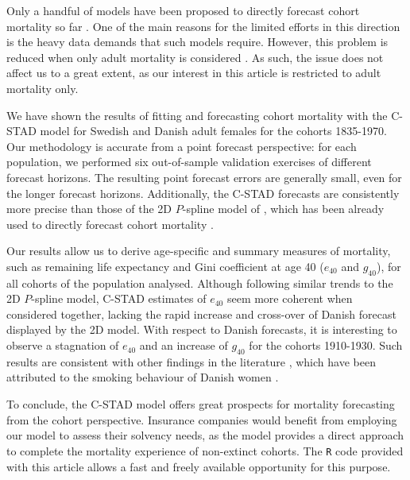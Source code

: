 \documentclass[11pt, a4paper]{article}
\begin{document}
Only a handful of models have been proposed to directly forecast cohort mortality so far \citep{chiou2009modeling,zanotto2017reconstruction,rizzi2019forecasting}. One of the main reasons for the limited efforts in this direction is the heavy data demands that such models require. However, this problem is reduced when only adult mortality is considered \citep{booth2006demographic}. As such, the issue does not affect us to a great extent, as our interest in this article is restricted to adult mortality only. 

We have shown the results of fitting and forecasting cohort mortality with the C-STAD model for Swedish and Danish adult females for the cohorts 1835-1970. Our methodology is accurate from a point forecast perspective: for each population, we performed six out-of-sample validation exercises of different forecast horizons. The resulting point forecast errors are generally small, even for the longer forecast horizons. Additionally, the C-STAD forecasts are consistently more precise than those of the 2D $P$-spline model of \cite{currie2004smoothing}, which has been already used to directly forecast cohort mortality \citep{cmi2007stochastic}. 

Our results allow us to derive age-specific and summary measures of mortality, such as remaining life expectancy and Gini coefficient at age 40 ($e_{40}$ and $g_{40}$), for all cohorts of the population analysed. Although following similar trends to the 2D $P$-spline model, C-STAD estimates of $e_{40}$ seem more coherent when considered together, lacking the rapid increase and cross-over of Danish forecast displayed by the 2D model. With respect to Danish forecasts, it is interesting to observe a stagnation of $e_{40}$ and an increase of $g_{40}$ for the cohorts 1910-1930. Such results are consistent with other findings in the literature \cite[see, e.g., Fig.~4 in][]{jacobsen2002long}, which have been attributed to the smoking behaviour of Danish women \citep{jacobsen2006causes,lindahl2016did}. 

To conclude, the C-STAD model offers great prospects for mortality forecasting from the cohort perspective. Insurance companies would benefit from employing our model to assess their solvency needs, as the model provides a direct approach to complete the mortality experience  of non-extinct cohorts. The \texttt{R} code provided with this article allows a fast and freely available opportunity for this purpose. 

\bigskip


 
\end{document}
